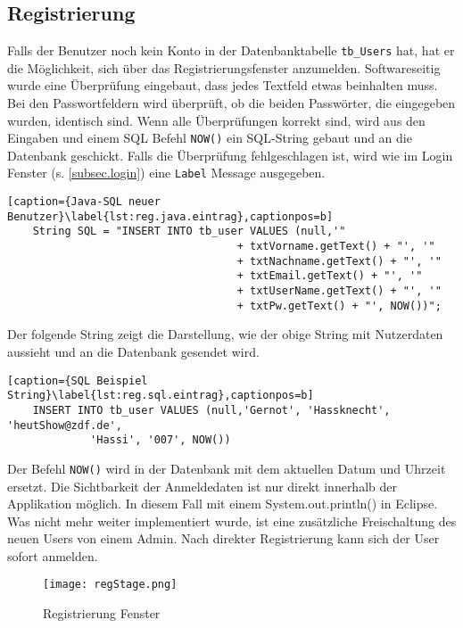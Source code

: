 \subsection{Registrierung}
\label{subsec.registrierung}
Falls der Benutzer noch kein Konto in der Datenbanktabelle \texttt{tb\_Users} hat, hat er die Möglichkeit, sich über das Registrierungsfenster anzumelden. Softwareseitig wurde eine Überprüfung eingebaut, dass jedes Textfeld etwas beinhalten muss. Bei den Passwortfeldern wird überprüft, ob die beiden Passwörter, die eingegeben wurden, identisch sind. Wenn alle Überprüfungen korrekt sind, wird aus den Eingaben und einem SQL Befehl \texttt{NOW()} ein SQL-String gebaut und an die Datenbank geschickt. Falls die Überprüfung fehlgeschlagen ist, wird wie im  Login Fenster (s. \ref{subsec.login}) eine \texttt{Label} Message ausgegeben.
\begin{lstlisting}[caption={Java-SQL neuer Benutzer}\label{lst:reg.java.eintrag},captionpos=b]
	String SQL = "INSERT INTO tb_user VALUES (null,'"
									+ txtVorname.getText() + "', '"
									+ txtNachname.getText() + "', '"
									+ txtEmail.getText() + "', '"
									+ txtUserName.getText() + "', '"
									+ txtPw.getText() + "', NOW())";
\end{lstlisting}
Der folgende String zeigt die Darstellung, wie der obige String mit Nutzerdaten aussieht und an die Datenbank gesendet wird.
\begin{lstlisting}[caption={SQL Beispiel String}\label{lst:reg.sql.eintrag},captionpos=b]
	INSERT INTO tb_user VALUES (null,'Gernot', 'Hassknecht', 'heutShow@zdf.de',
			 'Hassi', '007', NOW())
\end{lstlisting}

Der Befehl \texttt{NOW()} wird in der Datenbank mit dem aktuellen Datum und Uhrzeit ersetzt.
Die Sichtbarkeit der Anmeldedaten ist nur direkt innerhalb der Applikation möglich. In diesem Fall mit einem System.out.println() in Eclipse. Was nicht mehr weiter implementiert wurde, ist eine zusätzliche Freischaltung des neuen Users von einem Admin. Nach direkter Registrierung kann sich der User sofort anmelden.
\begin{figure}[h]
  \begin{center}
    \texttt{[image: regStage.png]}
  		  \caption{Registrierung Fenster}
     \label{fig.RegistrierungFenster}
  \end{center}
\end{figure}

